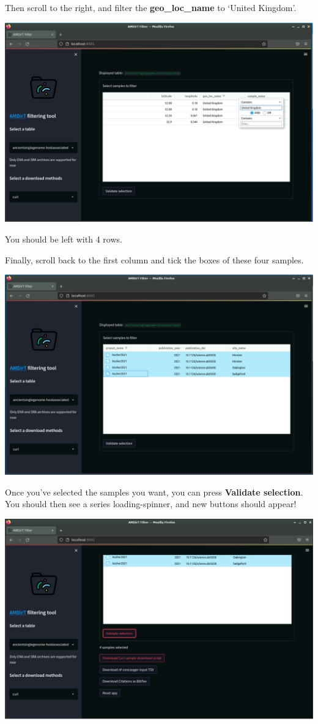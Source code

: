 \documentclass[
  letterpaper,
]{book}
\begin{document}
Then scroll to the right, and filter the \textbf{geo\_loc\_name} to
`United Kingdom'.

\includegraphics{assets/images/chapters/introduction-to-ancientmetagenomedir/amdirt-geofilter.png}

You should be left with 4 rows.

Finally, scroll back to the first column and tick the boxes of these
four samples.

\includegraphics{assets/images/chapters/introduction-to-ancientmetagenomedir/amdirt-tickbox.png}

Once you've selected the samples you want, you can press
\textbf{Validate selection}. You should then see a series
loading-spinner, and new buttons should appear!

\includegraphics{assets/images/chapters/introduction-to-ancientmetagenomedir/amdirt-validated.png}
\end{document}
